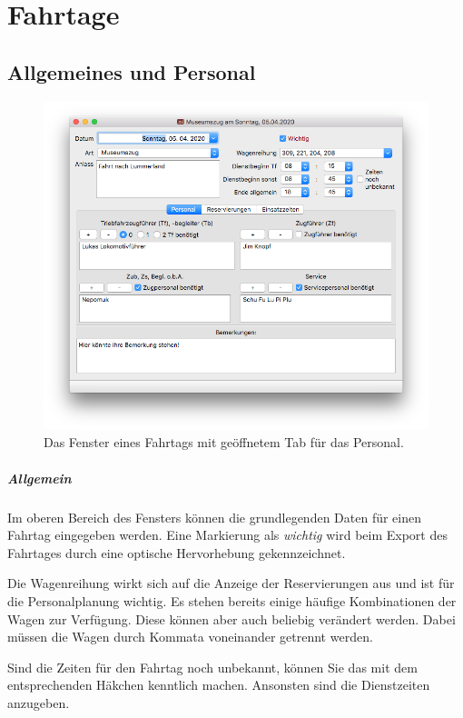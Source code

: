 \chapter{Fahrtage}\label{einsatz:fahrtag}
\section{Allgemeines und Personal}
\begin{figure}[!h]
	\includegraphics[width=\textwidth]{img/fahrtag_personal}
	\caption{Das Fenster eines Fahrtags mit geöffnetem Tab für das Personal.}
	\label{fig:einsatz:fahrtag:personal}
\end{figure}
\paragraph{Allgemein}
Im oberen Bereich des Fensters können die grundlegenden Daten für einen Fahrtag eingegeben werden.
Eine Markierung als \emph{wichtig} wird beim Export des Fahrtages durch eine optische Hervorhebung gekennzeichnet.

Die Wagenreihung wirkt sich auf die Anzeige der Reservierungen aus und ist für die Personalplanung wichtig.
Es stehen bereits einige häufige Kombinationen der Wagen zur Verfügung.
Diese können aber auch beliebig verändert werden.
Dabei müssen die Wagen durch Kommata voneinander getrennt werden.

Sind die Zeiten für den Fahrtag noch unbekannt, können Sie das mit dem entsprechenden Häkchen kenntlich machen.
Ansonsten sind die Dienstzeiten anzugeben.

